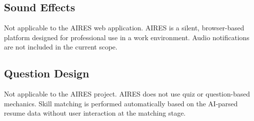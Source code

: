 \subsection{Sound Effects}
Not applicable to the AIRES web application. AIRES is a silent, browser-based platform designed for professional use in a work environment. Audio notifications are not included in the current scope.

\subsection{Question Design}
Not applicable to the AIRES project. AIRES does not use quiz or question-based mechanics. Skill matching is performed automatically based on the AI-parsed resume data without user interaction at the matching stage.

